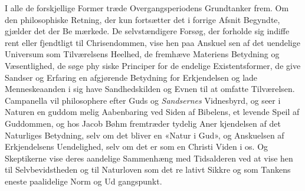 \documentclass[12pt,a4paper]{book}
\begin{document}
I alle de forskjellige Former træde Overgangsperiodens
Grundtanker frem. Om den philosophiske Retning, der kun
fortsætter det i forrige Afsnit Begyndte, gjælder det der Be\-%
mærkede. De selvstændigere Forsøg, der forholde sig indiffe\-%
rent eller fjendtligt til Chrisendommen, vise hen paa Anskuel\-%
sen af det uendelige Universum som Tilværelsens Heelhed, de
fremhæve Materiens Betydning og Væsentlighed, de søge phy\-%
siske Principer for de endelige Existentsformer, de give Sandser
og Erfaring en afgjørende Betydning for Erkjendelsen og lade
Menneskeaanden i sig have Sandhedskilden og Evnen til at
omfatte Tilværelsen. Campanella vil philosophere efter Guds
og \emph{Sandsernes} Vidnesbyrd, og seer i Naturen en guddom\-%
melig Aabenbaring ved Siden af Bibelens, et levende Speil af
Guddommen, og hos Jacob Bøhm fremtræder tydelig Aner\-%
kjendelsen af det Naturliges Betydning, selv om det bliver en
«Natur i Gud», og Anskuelsen af Erkjendelsens Uendelighed,
selv om det er som en Christi Viden i os. Og Skeptikerne
vise deres aandelige Sammenhæng med Tidsalderen ved at
vise hen til Selvbevidstheden og til Naturloven som det re\-%
lativt Sikkre og som Tankens eneste paalidelige Norm og Ud\-%
gangspunkt.
\end{document}
